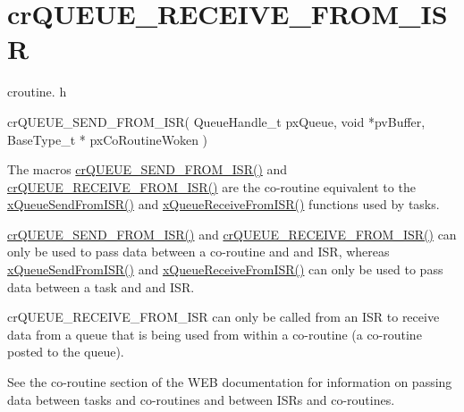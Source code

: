 \hypertarget{group__crQUEUE__RECEIVE__FROM__ISR}{}\section{cr\+Q\+U\+E\+U\+E\+\_\+\+R\+E\+C\+E\+I\+V\+E\+\_\+\+F\+R\+O\+M\+\_\+\+I\+SR}
\label{group__crQUEUE__RECEIVE__FROM__ISR}
croutine. h 
\begin{DoxyPre}
 crQUEUE\_SEND\_FROM\_ISR(
                           QueueHandle\_t pxQueue,
                           void *pvBuffer,
                           BaseType\_t * pxCoRoutineWoken
                      )\end{DoxyPre}


The macro\textquotesingle{}s \hyperlink{croutine_8h_ac8eb0a81c5cf69de7e4edd73ce44a3be}{cr\+Q\+U\+E\+U\+E\+\_\+\+S\+E\+N\+D\+\_\+\+F\+R\+O\+M\+\_\+\+I\+S\+R()} and \hyperlink{croutine_8h_a9c0fa977ca69adbddb4811affa2a71f7}{cr\+Q\+U\+E\+U\+E\+\_\+\+R\+E\+C\+E\+I\+V\+E\+\_\+\+F\+R\+O\+M\+\_\+\+I\+S\+R()} are the co-\/routine equivalent to the \hyperlink{queue_8h_a21d5919ed26c21d121df4a4debeb643c}{x\+Queue\+Send\+From\+I\+S\+R()} and \hyperlink{queue_8h_acdf528f5c91131ae2f31c669cfd65758}{x\+Queue\+Receive\+From\+I\+S\+R()} functions used by tasks.

\hyperlink{croutine_8h_ac8eb0a81c5cf69de7e4edd73ce44a3be}{cr\+Q\+U\+E\+U\+E\+\_\+\+S\+E\+N\+D\+\_\+\+F\+R\+O\+M\+\_\+\+I\+S\+R()} and \hyperlink{croutine_8h_a9c0fa977ca69adbddb4811affa2a71f7}{cr\+Q\+U\+E\+U\+E\+\_\+\+R\+E\+C\+E\+I\+V\+E\+\_\+\+F\+R\+O\+M\+\_\+\+I\+S\+R()} can only be used to pass data between a co-\/routine and and I\+SR, whereas \hyperlink{queue_8h_a21d5919ed26c21d121df4a4debeb643c}{x\+Queue\+Send\+From\+I\+S\+R()} and \hyperlink{queue_8h_acdf528f5c91131ae2f31c669cfd65758}{x\+Queue\+Receive\+From\+I\+S\+R()} can only be used to pass data between a task and and I\+SR.

cr\+Q\+U\+E\+U\+E\+\_\+\+R\+E\+C\+E\+I\+V\+E\+\_\+\+F\+R\+O\+M\+\_\+\+I\+SR can only be called from an I\+SR to receive data from a queue that is being used from within a co-\/routine (a co-\/routine posted to the queue).

See the co-\/routine section of the W\+EB documentation for information on passing data between tasks and co-\/routines and between I\+SR\textquotesingle{}s and co-\/routines.


